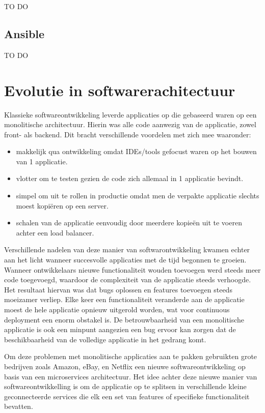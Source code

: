TO DO

\subsection{Ansible}

TO DO

\section{Evolutie in softwarerachitectuur}

Klassieke softwareontwikkeling leverde applicaties op die gebaseerd waren op een monolitische architectuur. Hierin was alle code aanwezig van de applicatie, zowel front- als backend. 
Dit bracht verschillende voordelen met zich mee waaronder:
\begin{itemize}
    \item makkelijk qua ontwikkeling omdat IDEs/tools gefocust waren op het bouwen van 1 applicatie.
    \item vlotter om te testen gezien de code zich allemaal in 1 applicatie bevindt. 
    \item simpel om uit te rollen in productie omdat men de verpakte applicatie slechts moest kopiëren op een server. 
    \item schalen van de applicatie eenvoudig door meerdere kopieën uit te voeren achter een load balancer.
\end{itemize} 

Verschillende nadelen van deze manier van softwarontwikkeling kwamen echter aan het licht wanneer succesvolle applicaties met de tijd begonnen te groeien. Wanneer ontwikkelaars nieuwe functionaliteit wouden toevoegen werd steeds meer code toegevoegd, waardoor de complexiteit van de applicatie steeds verhoogde. Het resultaat hiervan was dat bugs oplossen en features toevoegen steeds moeizamer verliep. Elke keer een functionaliteit veranderde aan de applicatie moest de hele applicatie opnieuw uitgerold worden, wat voor continuous deployment een enorm obstakel is.
De betrouwbaarheid van een monolitische applicatie is ook een minpunt aangezien een bug ervoor kan zorgen dat de beschikbaarheid van de volledige applicatie in het gedrang komt. \autocite{Richardson2015}

Om deze problemen met monolitische applicaties aan te pakken gebruikten grote bedrijven zoals Amazon, eBay, en Netflix een nieuwe softwareontwikkeling op basis van een microservices architectuur. Het idee achter deze nieuwe manier van softwareontwikkelling is om de applicatie op te splitsen in verschillende kleine geconnecteerde services die elk een set van features of specifieke functionaliteit bevatten.

